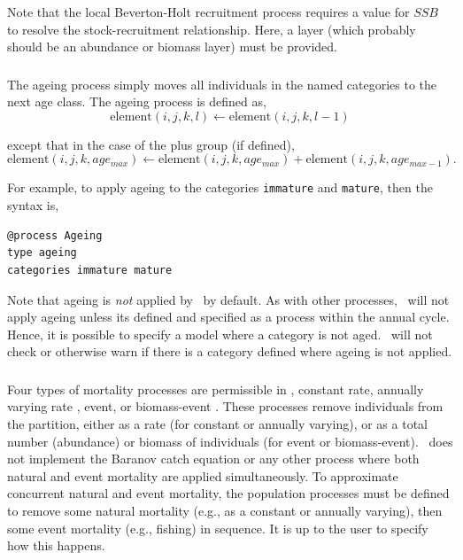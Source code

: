 Note that the local Beverton-Holt recruitment process requires a value for $SSB$ to resolve the stock-recruitment relationship. Here, a layer (which probably should be an abundance or biomass layer) must be provided.

\TODOend

\subsubsection{\label{sec:ageing}}

The ageing process simply moves all individuals in the named categories to the next age class. The ageing process is defined as,
\begin{equation}
  \text{element}(i,j,k,l) \leftarrow \text{element}(i,j,k,l-1)
\end{equation}

except that in the case of the plus group (if defined), 
\begin{equation}
  \text{element}(i,j,k,age_{max}) \leftarrow \text{element}(i,j,k,age_{max}) + \text{element}(i,j,k,age_{max-1}).
\end{equation}

For example, to apply ageing to the categories \texttt{immature} and \texttt{mature}, then the syntax is,

\begin{verbatim}
@process Ageing
type ageing
categories immature mature
\end{verbatim}

Note that ageing is \emph{not} applied by \SPM\ by default. As with other processes, \SPM\ will not apply ageing unless its defined and specified as a process within the annual cycle. Hence, it is possible to specify a model where a category is not aged. \SPM\ will not check or otherwise warn if there is a category defined where ageing is not applied.

\subsubsection{\label{sec:mortality}}

Four types of mortality processes are permissible in \SPM, constant rate, annually varying rate \NYI, event, or biomass-event \NYI. These processes remove individuals from the partition, either as a rate (for constant or annually varying), or as a total number (abundance) or biomass of individuals (for event or biomass-event). \SPM\ does not implement the Baranov catch equation or any other process where both natural and event mortality are applied simultaneously. To approximate concurrent natural and event mortality, the population processes must be defined to remove some natural mortality (e.g., as a constant or annually varying), then some event mortality (e.g., fishing) in sequence. It is up to the user to specify how this happens.

